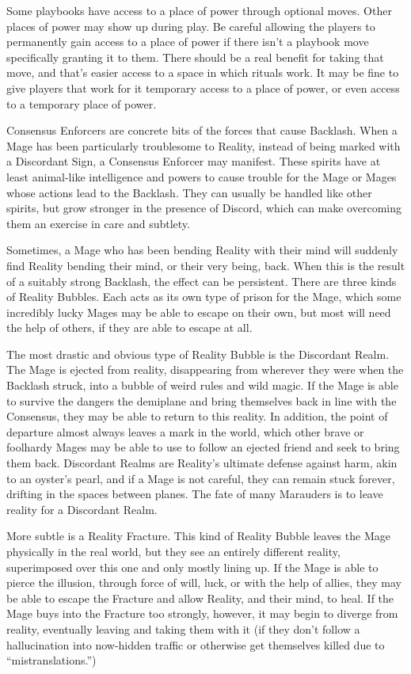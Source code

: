 \documentclass[letterpaper,12pt]{article}
\newcommand{\SECTION}[1]{\vspace{.5em}{\noindent\titlefont\large\textbf{#1}}

}
\begin{document}
Some playbooks have access to a place of power through optional
moves. Other places of power may show up during play. Be careful
allowing the players to permanently gain access to a place of power if
there isn't a playbook move specifically granting it to them. There
should be a real benefit for taking that move, and that's easier
access to a space in which rituals work. It may be fine to give
players that work for it temporary access to a place of power, or even
access to a temporary place of power.

\SECTION{Consensus Enforcer}
Consensus Enforcers are concrete bits of the forces that cause
Backlash. When a Mage has been particularly troublesome to Reality,
instead of being marked with a Discordant Sign, a Consensus Enforcer
may manifest. These spirits have at least animal-like intelligence and
powers to cause trouble for the Mage or Mages whose actions lead to
the Backlash. They can usually be handled like other spirits, but grow
stronger in the presence of Discord, which can make overcoming them an
exercise in care and subtlety.

\SECTION{Reality Bubbles}
Sometimes, a Mage who has been bending Reality with their mind will
suddenly find Reality bending their mind, or their very being,
back. When this is the result of a suitably strong Backlash, the
effect can be persistent. There are three kinds of Reality
Bubbles. Each acts as its own type of prison for the Mage, which some
incredibly lucky Mages may be able to escape on their own, but most
will need the help of others, if they are able to escape at all.

The most drastic and obvious type of Reality Bubble is the Discordant
Realm. The Mage is ejected from reality, disappearing from wherever
they were when the Backlash struck, into a bubble of weird rules and
wild magic. If the Mage is able to survive the dangers the demiplane
and bring themselves back in line with the Consensus, they may be able
to return to this reality. In addition, the point of departure almost
always leaves a mark in the world, which other brave or foolhardy
Mages may be able to use to follow an ejected friend and seek to bring
them back. Discordant Realms are Reality's ultimate defense against
harm, akin to an oyster's pearl, and if a Mage is not careful, they
can remain stuck forever, drifting in the spaces between planes. The
fate of many Marauders is to leave reality for a Discordant Realm.

More subtle is a Reality Fracture. This kind of Reality Bubble leaves
the Mage physically in the real world, but they see an entirely
different reality, superimposed over this one and only mostly lining
up. If the Mage is able to pierce the illusion, through force of will,
luck, or with the help of allies, they may be able to escape the
Fracture and allow Reality, and their mind, to heal. If the Mage buys
into the Fracture too strongly, however, it may begin to diverge from
reality, eventually leaving and taking them with it (if they don't
follow a hallucination into now-hidden traffic or otherwise get
themselves killed due to ``mistranslations.'')
\end{document}
